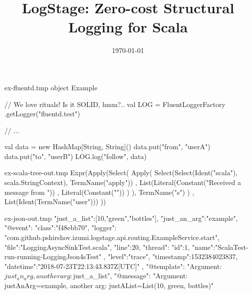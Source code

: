 \documentclass[usenames,dvipsnames]{beamer}
\title[LogStage]{LogStage: Zero-cost Structural Logging for Scala}
\institute[Septimal Mind Ltd]
    {
    Septimal Mind Ltd\\
    \medskip
    \textit{team@7mind.io}
    }
\date{\today}
\begin{document}
\begin{VerbatimOut}{ex-fluentd.tmp}
object Example {
  // We love rituals! Is it SOLID, hmm?..
  val LOG = FluentLoggerFactory
    .getLogger("fluentd.test")

  // ...

  val data = 
      new HashMap[String, String]()
  data.put("from", "userA")
  data.put("to", "userB")
  LOG.log("follow", data)
}
\end{VerbatimOut}



\begin{VerbatimOut}{ex-scala-tree-out.tmp}
Expr(Apply(Select(
  Apply(
    Select(Select(Ident("scala"), scala.StringContext), 
      TermName("apply"))
      , List(Literal(Constant("Received a message from "))
          , Literal(Constant(""))
        )
  ),
  TermName("s")
  )
, List(Ident(TermName("user")))
))
\end{VerbatimOut}

\begin{VerbatimOut}{ex-json-out.tmp}
{
"just_a_list":[10,"green","bottles"],
"just_an_arg":"example",
"@event":{
  "class":"f48ebb70",
  "logger": "com.github.pshirshov.izumi.logstage.api.routing.ExampleService.start",
  "file":"LoggingAsyncSinkTest.scala", "line":20,
  "thread":{ "id":1, "name":"ScalaTest-run-running-LoggingJson4sTest" },
  "level":"trace",
  "timestamp":1532384023837,
  "datetime":"2018-07-23T22:13:43.837Z[UTC]"
},
"@template":
"Argument: ${just_an_arg}, another arg: ${just_a_list}",
"@message":
"Argument: justAnArg=example, another arg: justAList=List(10, green, bottles)"
}
\end{VerbatimOut}

\end{document}
